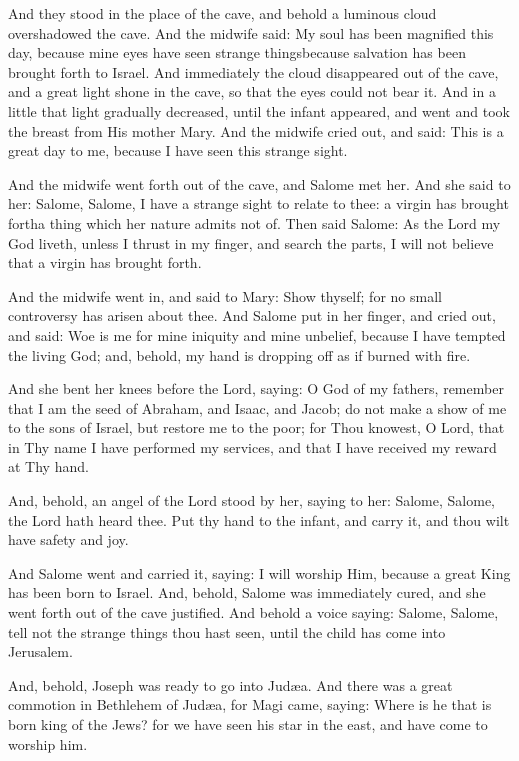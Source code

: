\pend\pstart
And they stood in the place of the cave, and behold a luminous cloud overshadowed the cave. And the midwife said: My soul has been magnified this day, because mine eyes have seen strange things\textemdash because salvation has been brought forth to Israel. And immediately the cloud disappeared out of the cave, and a great light shone in the cave, so that the eyes could not bear it. And in a little that light gradually decreased, until the infant appeared, and went and took the breast from His mother Mary. And the midwife cried out, and said: This is a great day to me, because I have seen this strange sight.

\pend\pstart
And the midwife went forth out of the cave, and Salome met her. And she said to her: Salome, Salome, I have a strange sight to relate to thee: a virgin has brought forth\textemdash a thing which her nature admits not of. Then said Salome: As the Lord my God liveth, unless I thrust in my finger, and search the parts, I will not believe that a virgin has brought forth.

\pend\pstart
{}

\pend\pstart
And the midwife went in, and said to Mary: Show thyself; for no small controversy has arisen about thee. And Salome put in her finger, and cried out, and said: Woe is me for mine iniquity and mine unbelief, because I have tempted the living God; and, behold, my hand is dropping off as if burned with fire.

\pend\pstart
And she bent her knees before the Lord, saying: O God of my fathers, remember that I am the seed of Abraham, and Isaac, and Jacob; do not make a show of me to the sons of Israel, but restore me to the poor; for Thou knowest, O Lord, that in Thy name I have performed my services, and that I have received my reward at Thy hand.

\pend\pstart
And, behold, an angel of the Lord stood by her, saying to her: Salome, Salome, the Lord hath heard thee. Put thy hand to the infant, and carry it, and thou wilt have safety and joy.

\pend\pstart
And Salome went and carried it, saying: I will worship Him, because a great King has been born to Israel. And, behold, Salome was immediately cured, and she went forth out of the cave justified. And behold a voice saying: Salome, Salome, tell not the strange things thou hast seen, until the child has come into Jerusalem.

\pend\pstart
{}

\pend\pstart
And, behold, Joseph was ready to go into Judæa. And there was a great commotion in Bethlehem of Judæa, for Magi came, saying: Where is he that is born king of the Jews? for we have seen his star in the east, and have come to worship him.

